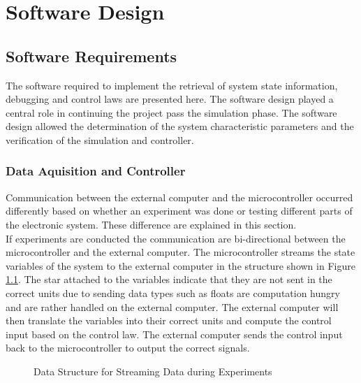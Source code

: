 \chapter{Software Design}
\label{chp5:software}
\section{Software Requirements}
\label{sec:software_requirements}
The software required to implement the retrieval of system state information, debugging and control laws are presented here. The software design played a central role in continuing the project pass the simulation phase. The software design allowed the determination of the system characteristic parameters and the verification of the simulation and controller.

\subsection{Data Aquisition and Controller}

Communication between the external computer and the microcontroller occurred differently based on whether an experiment was done or testing different parts of the electronic system. These difference are explained in this section.\\

If experiments are conducted the communication are bi-directional between the microcontroller and the external computer. The microcontroller streams the state variables of the system to the external computer in the structure shown in Figure \ref{fig:data_struct}. The star attached to the variables indicate that they are not sent in the correct units due to sending data types such as floats are computation hungry and are rather handled on the external computer. The external computer will then translate the variables into their correct units and compute the control input based on the control law. The external computer sends the control input back to the microcontroller to output the correct signals.\\

\begin{figure}[h]
	\centering
	
	\caption{Data Structure for Streaming Data during Experiments}
	\label{fig:data_struct}
\end{figure}

